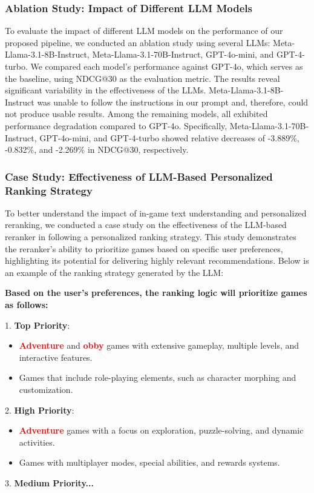 \subsubsection{Ablation Study: Impact of Different LLM Models}

To evaluate the impact of different LLM models on the performance of our proposed pipeline, we conducted an ablation study using several LLMs: Meta-Llama-3.1-8B-Instruct, Meta-Llama-3.1-70B-Instruct, GPT-4o-mini, and GPT-4-turbo. We compared each model's performance against GPT-4o, which serves as the baseline, using NDCG@30 as the evaluation metric. The results reveal significant variability in the effectiveness of the LLMs. Meta-Llama-3.1-8B-Instruct was unable to follow the instructions in our prompt and, therefore, could not produce usable results. Among the remaining models, all exhibited performance degradation compared to GPT-4o. Specifically, Meta-Llama-3.1-70B-Instruct, GPT-4o-mini, and GPT-4-turbo showed relative decreases of -3.889\%, -0.832\%, and -2.269\% in NDCG@30, respectively.

\subsubsection{Case Study: Effectiveness of LLM-Based Personalized Ranking Strategy}

To better understand the impact of in-game text understanding and personalized reranking, we conducted a case study on the effectiveness of the LLM-based reranker in following a personalized ranking strategy. This study demonstrates the reranker’s ability to prioritize games based on specific user preferences, highlighting its potential for delivering highly relevant recommendations. Below is an example of the ranking strategy generated by the LLM:
\begin{tcolorbox}[colback=gray!5, colframe=gray!80, title=LLM Ranking Strategy, label=strategy]
\textbf{Based on the user's preferences, the ranking logic will prioritize games as follows:}

1. \textbf{Top Priority}:
   \begin{itemize}
      \item \textcolor{red}{\textbf{Adventure}} and \textcolor{red}{\textbf{obby}} games with extensive gameplay, multiple levels, and interactive features.
      \item Games that include role-playing elements, such as character morphing and customization.
   \end{itemize}

2. \textbf{High Priority}:
   \begin{itemize}
      \item \textcolor{red}{\textbf{Adventure}} games with a focus on exploration, puzzle-solving, and dynamic activities.
      \item Games with multiplayer modes, special abilities, and rewards systems.
   \end{itemize}

3. \textbf{Medium Priority...}
\end{tcolorbox}

